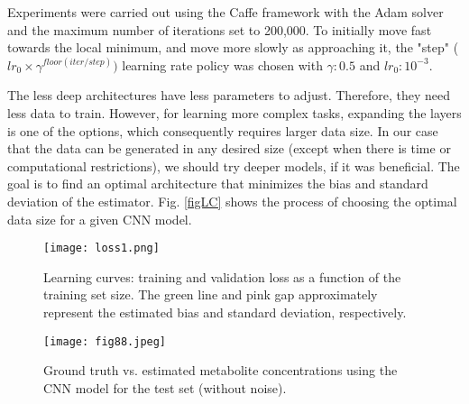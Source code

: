 \documentclass{llncs}
\begin{document}
Experiments were carried out using the Caffe framework \cite{caffe} with the Adam solver and the maximum number of iterations set to 200,000.
To initially move fast towards the local minimum, and move more slowly as approaching it, the "step" ($lr_0 \times \gamma^{floor(iter / step)})$ learning rate policy was chosen with $\gamma:0.5$ and $lr_0:10^{-3}$. 

The less deep architectures have less parameters to adjust. 
Therefore, they need less data to train. 
However, for learning more complex tasks, 
expanding the layers is one of the options, which consequently requires larger data size.
In our case that the data can be generated in any desired size (except when there is time or computational restrictions),
we should try deeper models, if it was beneficial. The goal is to find an optimal architecture that minimizes the bias and standard deviation of the estimator. Fig. \ref{figLC} shows the process of choosing the optimal data size for a given CNN model.



\begin{figure}[t!]
\centering
\begin{minipage}{.48\textwidth}
  \centering
  \texttt{[image: loss1.png]}
  \caption{Learning curves: training and validation loss as a function of the training set size.
    The green line and pink gap approximately represent the estimated bias and standard deviation, respectively.}
  \label{figLC}
\end{minipage}%
\hspace*{\fill}
\begin{minipage}{.48\textwidth}
  \centering
  \texttt{[image: fig88.jpeg]}
  \caption{Ground truth vs. estimated metabolite concentrations using the CNN model for the test set (without noise).}
  \label{figXY}
\end{minipage}
\end{figure}

\end{document}
